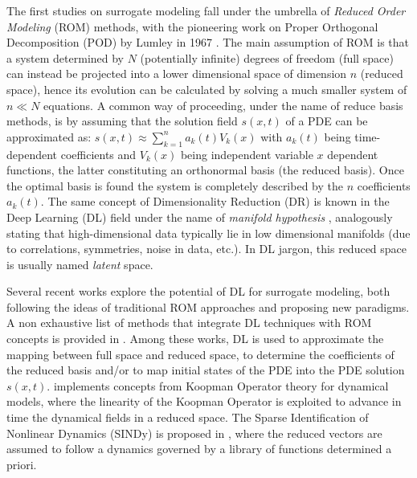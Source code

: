 The first studies on surrogate modeling fall under the umbrella of \textit{Reduced Order Modeling} (ROM) \cite{ROM} methods, with the pioneering work on Proper Orthogonal Decomposition (POD) by Lumley in 1967 \cite{pod_lumley}. The main assumption of ROM is that a system determined by $N$ (potentially infinite) degrees of freedom (full space) can instead be projected into a lower dimensional space of dimension $n$ (reduced space), hence its evolution can be calculated by solving a much smaller system of $n\ll N$ equations. 
A common way of proceeding, under the name of reduce basis methods, is by assuming that the solution field $s(x,t)$ of a PDE can be approximated as: $s(x,t)\approx\sum_{k=1}^n a_k(t)V_k(x)$ with $a_k(t)$ being time-dependent coefficients and $V_k(x)$ being independent variable $x$ dependent functions, the latter constituting an orthonormal basis (the reduced basis). Once the optimal basis is found the system is completely described by the $n$ coefficients $a_k(t)$. 
The same concept of Dimensionality Reduction (DR) is known in the Deep Learning (DL) field under the name of \textit{manifold hypothesis} \cite{Fefferman2016, goldt2020modeling, cohen2014learning, higgins2018towards}, analogously stating that high-dimensional data typically lie in low dimensional manifolds (due to correlations, symmetries, noise in data, etc.). In DL jargon, this reduced space is usually named \textit{latent} space.

Several recent works explore the potential of DL for surrogate modeling, both following the ideas of traditional ROM approaches and proposing new paradigms. A non exhaustive list of methods that integrate DL techniques with ROM concepts is provided in \cite{FRESCA2022114181, bhattacharya2021model, romcnn, SoleraRico2024}. Among these works, DL is used to approximate the mapping between full space and reduced space, to determine the coefficients of the reduced basis and/or to map initial states of the PDE into the PDE solution $s(x,t)$. \cite{Lusch2018} implements concepts from Koopman Operator theory \cite{kutz2016koopman} for dynamical models, where the linearity of the Koopman Operator is exploited to advance in time the dynamical fields in a reduced space. The Sparse Identification of Nonlinear Dynamics (SINDy) is proposed in \cite{Brunton2016}, where the reduced vectors are assumed to follow a dynamics governed by a library of functions determined a priori.

